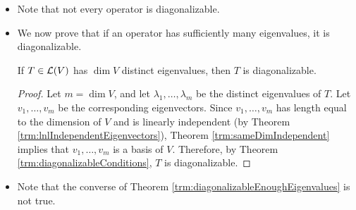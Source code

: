 \documentclass[../main.tex]{subfiles}
\begin{document}
\begin{itemize}
\begin{theorem}
\begin{proof}
            Suppose that $v_1,\dots,v_n$ is a basis of $V$ consisting of eigenvectors of $T$. Thus, since each $v\in V$ is a linear combination of eigenvectors of $T$, $V=E(\lambda_1,T)+\cdots+E(\lambda_m,T)$. Therefore, Theorem \ref{trm:directSumEigenspaces} implies that $V=E(\lambda_1,T)\oplus\cdots\oplus E(\lambda_m,T)$, as desired.\par
            Suppose $V=E(\lambda_1,T)\oplus\cdots\oplus E(\lambda_m,T)$. Then naturally $\dim V=\dim E(\lambda_1,T)+\cdots+\dim E(\lambda_m,T)$, as desired.\par
            Suppose $\dim V=\dim E(\lambda_1,T)+\cdots+\dim E(\lambda_m,T)$. Choose a basis of each $E(\lambda_j,T)$. Concatenate all these bases to form a list $v_1,\dots,v_n$ of eigenvectors of $T$. We now wish to show that $v_1,\dots,v_n$ is a basis of $V$. To do so, already knowing that $n=\dim V$ by hypothesis, Theorem \ref{trm:sameDimIndependent} tells us that we need only additionally show that $v_1,\dots,v_n$ is linearly independent. Let $a_1,\dots,a_n\in\F$ be such that $a_1v_1+\cdots+a_nv_n=0$. For each $j=1,\dots,m$, let $u_j$ denote the sum of all the terms $a_kv_k$ such that $v_k\in E(\lambda_j,T)$. Thus, each $u_j\in E(\lambda_j,T)$ and $u_1+\cdots+u_m=0$. But since $u_1,\dots,u_m$ are eigenvectors of $T$ corresponding to distinct eigenvalues, Theorem \ref{trm:lnlIndependentEigenvectors} implies that $u_1,\dots,u_m$ are linearly independent. This combined with the previous result implies that $u_j=0$ for each $j=1,\dots,m$. It follows since each (zero) $u_j$ is a linear combination of a basis of an eigenspace, each $a_j=0$, as desired.
        \end{proof}
    \end{theorem}
    \item Note that not every operator is diagonalizable.
    \item We now prove that if an operator has sufficiently many eigenvalues, it is diagonalizable.
    \begin{theorem}\label{trm:diagonalizableEnoughEigenvalues}
        If $T\in\mathcal{L}(V)$ has $\dim V$ distinct eigenvalues, then $T$ is diagonalizable.
        \begin{proof}
            Let $m=\dim V$, and let $\lambda_1,\dots,\lambda_m$ be the distinct eigenvalues of $T$. Let $v_1,\dots,v_m$ be the corresponding eigenvectors. Since $v_1,\dots,v_m$ has length equal to the dimension of $V$ and is linearly independent (by Theorem \ref{trm:lnlIndependentEigenvectors}), Theorem \ref{trm:sameDimIndependent} implies that $v_1,\dots,v_m$ is a basis of $V$. Therefore, by Theorem \ref{trm:diagonalizableConditions}, $T$ is diagonalizable.
        \end{proof}
    \end{theorem}
    \item Note that the converse of Theorem \ref{trm:diagonalizableEnoughEigenvalues} is not true.
\end{itemize}
\end{document}
